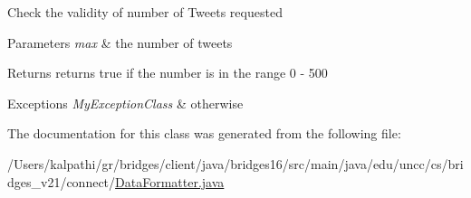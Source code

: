 Check the validity of number of Tweets requested 
\begin{DoxyParams}{Parameters}
{\em max} & the number of tweets \\
\hline
\end{DoxyParams}
\begin{DoxyReturn}{Returns}
returns true if the number is in the range 0 -\/ 500 
\end{DoxyReturn}

\begin{DoxyExceptions}{Exceptions}
{\em My\+Exception\+Class} & otherwise \\
\hline
\end{DoxyExceptions}


The documentation for this class was generated from the following file\+:\begin{DoxyCompactItemize}
\item 
/\+Users/kalpathi/gr/bridges/client/java/bridges16/src/main/java/edu/uncc/cs/bridges\+\_\+v21/connect/\hyperlink{_data_formatter_8java}{Data\+Formatter.\+java}\end{DoxyCompactItemize}
